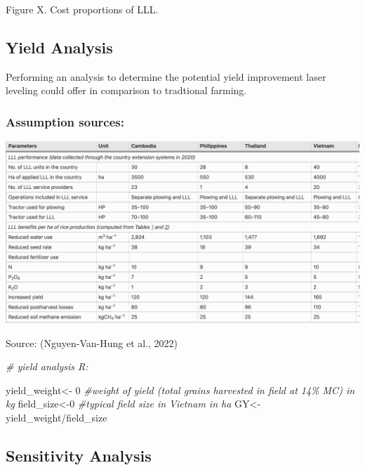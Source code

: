 \documentclass[
]{article}
\newenvironment{Shaded}{\begin{snugshade}}{\end{snugshade}}
\newcommand{\CommentTok}[1]{\textcolor[rgb]{0.56,0.35,0.01}{\textit{#1}}}
\newcommand{\DecValTok}[1]{\textcolor[rgb]{0.00,0.00,0.81}{#1}}
\newcommand{\NormalTok}[1]{#1}
\newcommand{\OtherTok}[1]{\textcolor[rgb]{0.56,0.35,0.01}{#1}}
\newcommand{\SpecialCharTok}[1]{\textcolor[rgb]{0.00,0.00,0.00}{#1}}
\begin{document}
Figure X. Cost proportions of LLL.

\hypertarget{yield-analysis}{%
\subsection{Yield Analysis}\label{yield-analysis}}

Performing an analysis to determine the potential yield improvement
laser leveling could offer in comparison to tradtional farming.

\hypertarget{assumption-sources}{%
\subsubsection{Assumption sources:}\label{assumption-sources}}

\includegraphics{images/Screenshot 2023-06-12 at 9.38.09 PM.png}

Source: (Nguyen-Van-Hung et al., 2022)

\begin{Shaded}
\begin{Highlighting}[]
\CommentTok{\# yield analysis R:}

\NormalTok{yield\_weight}\OtherTok{\textless{}{-}} \DecValTok{0} \CommentTok{\#weight of yield (total grains harvested in field at 14\% MC) in kg}
\NormalTok{field\_size}\OtherTok{\textless{}{-}}\DecValTok{0}  \CommentTok{\#typical field size in Vietnam in ha}
\NormalTok{GY}\OtherTok{\textless{}{-}}\NormalTok{ yield\_weight}\SpecialCharTok{/}\NormalTok{field\_size}
\end{Highlighting}
\end{Shaded}

\hypertarget{sensitivity-analysis}{%
\subsection{Sensitivity Analysis}\label{sensitivity-analysis}}
\end{document}
